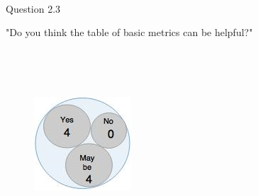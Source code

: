 \\
\begin{shaded} Question 2.3 \end{shaded} \label{question:hybris_architecture/interview/question_2.3}
"Do you think the table of basic metrics can be helpful?"\\

\\

\\
\begin{figure}[H]
\begin{center}
\includegraphics[scale=0.5]{figures/question2_3}
\label{fig:hybris_architecture/interview/question2-3}
\end{center}
\end{figure}
